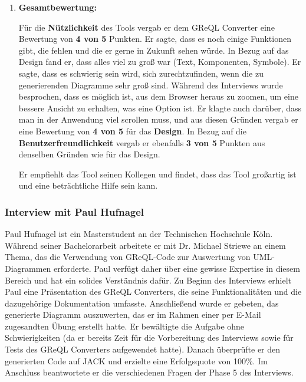 \begin{enumerate}[itemsep=8pt, parsep=5pt]
    \item \textbf{Gesamtbewertung:}


    Für die \textbf{Nützlichkeit} des Tools vergab er dem GReQL Converter eine Bewertung von \textbf{4 von 5} Punkten.
    Er sagte, dass es noch einige Funktionen gibt, die fehlen und die er gerne in Zukunft sehen würde. In Bezug auf das
    Design fand er, dass alles viel zu groß war (Text, Komponenten, Symbole). Er sagte, dass es schwierig sein wird,
    sich zurechtzufinden, wenn die zu generierenden Diagramme sehr groß sind. Während des Interviews wurde besprochen,
    dass es möglich ist, aus dem Browser heraus zu zoomen, um eine bessere Ansicht zu erhalten, was eine Option ist.
    Er klagte auch darüber, dass man in der Anwendung viel scrollen muss, und aus diesen Gründen vergab er eine
    Bewertung von \textbf{4 von 5} für das \textbf{Design}. In Bezug auf die \textbf{Benutzerfreundlichkeit} vergab er
    ebenfalls \textbf{3 von 5} Punkten aus denselben Gründen wie für das Design.

    Er empfiehlt das Tool seinen Kollegen und findet, dass das Tool großartig ist und eine beträchtliche Hilfe sein
    kann.
\end{enumerate}

\subsubsection{Interview mit Paul Hufnagel}

Paul Hufnagel ist ein Masterstudent an der Technischen Hochschule Köln. Während seiner Bachelorarbeit arbeitete er mit
Dr. Michael Striewe an einem Thema, das die Verwendung von GReQL-Code zur Auswertung von UML-Diagrammen erforderte.
Paul verfügt daher über eine gewisse Expertise in diesem Bereich und hat ein solides Verständnis dafür. Zu Beginn des
Interviews erhielt Paul eine Präsentation des GReQL Converters, die seine Funktionalitäten und die dazugehörige
Dokumentation umfasste. Anschließend wurde er gebeten, das generierte Diagramm auszuwerten, das er im Rahmen einer per
E-Mail zugesandten Übung erstellt hatte. Er bewältigte die Aufgabe ohne Schwierigkeiten (da er bereits Zeit für die
Vorbereitung des Interviews sowie für Tests des GReQL Converters aufgewendet hatte). Danach überprüfte er den
generierten Code auf JACK und erzielte eine Erfolgsquote von 100\%. Im Anschluss beantwortete er die verschiedenen
Fragen der Phase 5 des Interviews.

